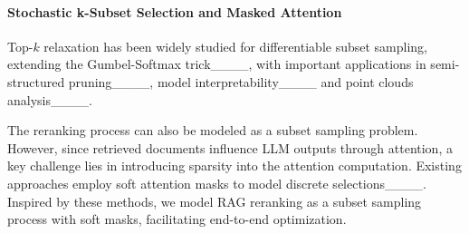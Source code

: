 


\paragraph{Stochastic k-Subset Selection and Masked Attention}
Top-$k$ relaxation has been widely studied for differentiable subset sampling, extending the Gumbel-Softmax trick____, with important applications in  semi-structured pruning____, model interpretability____ and point clouds analysis____.

The reranking process can also be modeled as a subset sampling problem. However, since retrieved documents influence LLM outputs through attention, a key challenge lies in introducing sparsity into the attention computation. Existing approaches employ soft attention masks to model discrete selections____. Inspired by these methods, we model RAG reranking as a subset sampling process with soft masks, facilitating end-to-end optimization.



